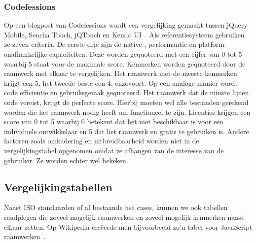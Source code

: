 \subsubsection{Codefessions}
Op een blogpost van Codefessions wordt een vergelijking gemaakt tussen jQuery Mobile, Sencha Touch, jQTouch en Kendo UI~\cite{Sarrafi2012}.  
Als referentiesysteem gebruiken ze zeven criteria.  De eerste drie zijn de native , performantie en platform-onafhankelijke capaciteiten.  
Deze worden gequoteerd met een cijfer van 0 tot 5 waarbij 5 staat voor de maximale score. 
Kenmerken worden gequoteerd door de raamwerk met elkaar te vergelijken.  
Het raamwerk met de meeste kenmerken krijgt een 5, het tweede beste een 4, enzovoort.  
Op een analoge manier wordt code efficiëntie en gebruiksgemak gequoteerd.  
Het raamwerk dat de minste lijnen code vereist, krijgt de perfecte score. 
Hierbij moeten wel alle bestanden gerekend worden die het raamwerk nodig heeft om functioneel te zijn. 
Licenties krijgen een score van 0 tot 5 waarbij 0 betekent dat het niet beschikbaar is voor een individuele ontwikkelaar en 5 dat het raamwerk  en gratis te gebruiken is. 
Andere factoren zoals omkadering en uitbreidbaarheid worden niet in de vergelijkingstabel opgenomen omdat ze afhangen van de interesse van de gebruiker.  
Ze worden echter wel bekeken.


\subsection{Vergelijkingstabellen}
Naast ISO standaarden of al bestaande use cases, kunnen we ook tabellen raadplegen die zoveel mogelijk raamwerken en zoveel mogelijk kenmerken naast elkaar zetten.  
Op Wikipedia creëerde men bijvoorbeeld zo'n tabel voor JavaScript raamwerken~\cite{Wikipedia}.  


